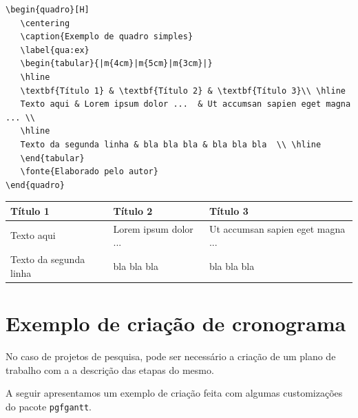 \begin{verbatim}
\begin{quadro}[H]
   \centering
   \caption{Exemplo de quadro simples}
   \label{qua:ex}
   \begin{tabular}{|m{4cm}|m{5cm}|m{3cm}|}
   \hline
   \textbf{Título 1} & \textbf{Título 2} & \textbf{Título 3}\\ \hline
   Texto aqui & Lorem ipsum dolor ...  & Ut accumsan sapien eget magna ... \\ 
   \hline
   Texto da segunda linha & bla bla bla & bla bla bla  \\ \hline
   \end{tabular}
   \fonte{Elaborado pelo autor}
\end{quadro}
\end{verbatim}

\begin{quadro}[H]
   \centering
   \caption{Exemplo de quadro simples}
   \label{qua:ex}
   \begin{tabular}{|m{4cm}|m{5cm}|m{3cm}|}
   \hline
   \textbf{Título 1} & \textbf{Título 2} & \textbf{Título 3}\\ \hline
   Texto aqui & Lorem ipsum dolor ...  & Ut accumsan sapien eget magna ... \\ \hline
   Texto da segunda linha & bla bla bla & bla bla bla  \\ \hline
   \end{tabular}
\end{quadro}

\pagebreak




\section{Exemplo de criação de cronograma}


No caso de projetos de pesquisa, pode ser necessário a criação de um plano de trabalho com a a descrição das etapas do mesmo.

A seguir apresentamos um exemplo de criação feita com algumas customizações do pacote \verb|pgfgantt|.

